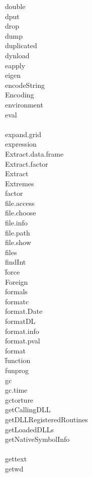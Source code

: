 \documentclass[12pt]{article}
\begin{document}
{double} \\
{dput} \\
{drop} \\
{dump} \\
{duplicated} \\
{dynload} \\
{eapply} \\
{eigen} \\
{encodeString} \\
{Encoding} \\
{environment} \\
{eval} \\
 \\
{expand.grid} \\
{expression} \\
{Extract.data.frame} \\
{Extract.factor} \\
{Extract} \\
{Extremes} \\
{factor} \\
{file.access} \\
{file.choose} \\
{file.info} \\
{file.path} \\
{file.show} \\
{files} \\
{findInt} \\
\f{force} \\
{Foreign} \\
{formals} \\
{formatc} \\
{format.Date} \\
{formatDL} \\
{format.info} \\
{format.pval} \\
{format} \\
\f{function} \\
{funprog} \\
{gc} \\
{gc.time} \\
{gctorture} \\
{getCallingDLL} \\
{getDLLRegisteredRoutines} \\
{getLoadedDLLs} \\
{getNativeSymbolInfo} \\
 \\
{gettext} \\
{getwd} \\
\end{document}
